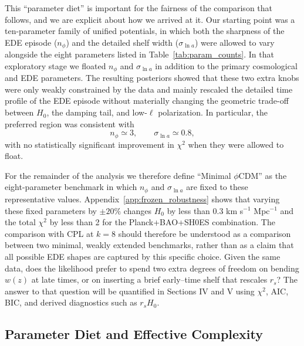 \documentclass[a4paper,11pt]{article}
\begin{document}
This ``parameter diet'' is important for the fairness of the comparison that follows, and we are explicit about how we arrived at it. Our starting point was a ten-parameter family of unified potentials, in which both the sharpness of the EDE episode ($n_\phi$) and the detailed shelf width ($\sigma_{\ln a}$) were allowed to vary alongside the eight parameters listed in Table~\ref{tab:param_counts}. In that exploratory stage we floated $n_\phi$ and $\sigma_{\ln a}$ in addition to the primary cosmological and EDE parameters. The resulting posteriors showed that these two extra knobs were only weakly constrained by the data and mainly rescaled the detailed time profile of the EDE episode without materially changing the geometric trade-off between $H_0$, the damping tail, and low-$\ell$ polarization. In particular, the preferred region was consistent with
\begin{equation}
n_\phi \simeq 3, \qquad \sigma_{\ln a} \simeq 0.8,
\end{equation}
with no statistically significant improvement in $\chi^2$ when they were allowed to float.

For the remainder of the analysis we therefore define ``Minimal $\phi$CDM'' as the eight-parameter benchmark in which $n_\phi$ and $\sigma_{\ln a}$ are fixed to these representative values. Appendix~\ref{app:frozen_robustness} shows that varying these fixed parameters by $\pm 20\%$ changes $H_0$ by less than 0.3 km s$^{-1}$ Mpc$^{-1}$ and the total $\chi^2$ by less than 2 for the Planck+BAO+SH0ES combination. The comparison with CPL at $k = 8$ should therefore be understood as a comparison between two minimal, weakly extended benchmarks, rather than as a claim that all possible EDE shapes are captured by this specific choice. Given the same data, does the likelihood prefer to spend two extra degrees of freedom on bending $w(z)$ at late times, or on inserting a brief early--time shelf that rescales $r_s$? The answer to that question will be quantified in Sections IV and V using $\chi^2$, AIC, BIC, and derived diagnostics such as $r_s H_0$.


\subsection{Parameter Diet and Effective Complexity}
\label{sec:param_diet}
\end{document}
